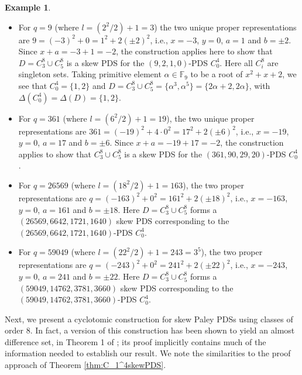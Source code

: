 \documentclass[12pt, a4paper]{article}
\theoremstyle{definition}
\newtheorem{example}[theorem]{Example}
\begin{document}
\begin{example}\label{ex:skewPDSC0C2}
\begin{itemize}
\item[(i)] For $q=9$ (where $l=(2^2/2)+1=3$) the two unique proper representations are $9=(-3)^2+0=1^2+2(\pm 2)^2$, i.e., $x=-3$, $y=0$, $a=1$ and $b=\pm 2$.  Since $x+a=-3+1=-2$, the construction applies here to show that $D=C_3^8 \cup C_5^8$ is a skew PDS for the $(9,2,1,0)$-PDS $C_0^4$. Here all $C_i^8$ are singleton sets.
Taking primitive element $\alpha \in \mathbb{F}_9$ to be a root of $x^2+x+2$, we see that $C_0^4=\{1,2\}$ and $D=C_3^8 \cup C_5^8=\{\alpha^3,\alpha^5\}=\{2\alpha+2,2\alpha\}$, with $\Delta(C_0^4)=\Delta(D)=\{1,2\}$.  
\item[(ii)] For $q=361$ (where $l=(6^2/2)+1=19$), the two unique proper representations are $361=(-19)^2+4 \cdot 0^2=17^2+2(\pm 6)^2$, i.e., $x=-19$, $y=0$, $a=17$ and $b=\pm 6$.  Since $x+a=-19+17=-2$, the construction applies to show that $C_3^8 \cup C_5^8$ is a skew PDS for the $(361,90,29,20)$-PDS $C_0^4$.

\item[(iii)] For $q=26569$ (where $l=(18^2/2)+1=163$), the two proper representations are $q=(-163)^2+0^2=161^2+2(\pm 18)^2$, i.e.,  $x=-163$, $y=0$, $a=161$ and $b=\pm 18$.  Here $D=C_3^8 \cup C_5^8$ forms a $(26569,6642,1721,1640)$ skew PDS corresponding  to the $(26569,6642,1721,1640)$-PDS $C_0^4$.

\item[(iv)] For $q=59049$ (where $l=(22^2/2)+1=243=3^5$), the two proper representations are $q=(-243)^2+0^2=241^2+2(\pm 22)^2$, i.e.,  $x=-243$, $y=0$, $a=241$ and $b=\pm 22$.  Here $D=C_3^8 \cup C_5^8$ forms a $(59049,14762,3781,3660)$ skew PDS corresponding to the $(59049,14762,3781,3660)$-PDS $C_0^4$.
\end{itemize}
\end{example}

Next, we present a cyclotomic construction for skew Paley PDSs using classes of order $8$.  In fact, a version of this construction has been shown to yield an almost difference set, in Theorem 1 of \cite{DinPotWan}; its proof implicitly contains much of the information needed to establish our result.  We note the similarities to the proof approach of Theorem \ref{thm:C_1^4skewPDS}.
\end{document}
